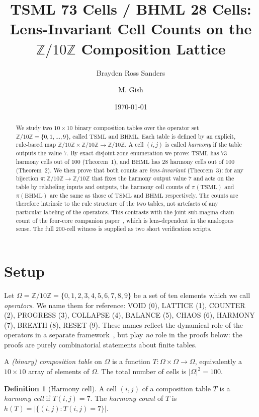 \documentclass[11pt,reqno]{amsart}
\title[TSML 73 / BHML 28 cells on $\Zten$]
  {TSML 73 Cells / BHML 28 Cells:\\
   Lens-Invariant Cell Counts on the\\
   $\mathbb{Z}/10\mathbb{Z}$ Composition Lattice}
\author{Brayden Ross Sanders}
\author{M. Gish}
\date{\today}
\theoremstyle{plain}
\theoremstyle{definition}
\newtheorem{definition}[theorem]{Definition}
\theoremstyle{remark}
\newcommand{\Z}{\mathbb{Z}}
\newcommand{\Zten}{\Z/10\Z}
\newcommand{\TSML}{\mathrm{TSML}}
\newcommand{\BHML}{\mathrm{BHML}}
\begin{document}
\begin{abstract}
We study two $10\times10$ binary composition tables over the
operator set $\Zten = \{0,1,\ldots,9\}$, called $\TSML$ and
$\BHML$. Each table is defined by an explicit, rule-based map
$\Zten \times \Zten \to \Zten$. A cell $(i,j)$ is called
\emph{harmony} if the table outputs the value $7$. By exact
disjoint-zone enumeration we prove:
$\TSML$ has $73$ harmony cells out of $100$ (Theorem~1), and
$\BHML$ has $28$ harmony cells out of $100$ (Theorem~2). We then
prove that both counts are \emph{lens-invariant} (Theorem~3): for
any bijection $\pi : \Zten \to \Zten$ that fixes the harmony
output value $7$ and acts on the table by relabeling inputs and
outputs, the harmony cell counts of $\pi(\TSML)$ and $\pi(\BHML)$
are the same as those of $\TSML$ and $\BHML$ respectively. The
counts are therefore intrinsic to the rule structure of the two
tables, not artefacts of any particular labeling of the
operators. This contrasts with the joint sub-magma chain count of
the four-core companion paper~\cite{J02}, which is lens-dependent
in the analogous sense. The full $200$-cell witness is supplied as
two short verification scripts.
\end{abstract}

\maketitle

\section{Setup}\label{sec:setup}

Let $\Omega = \Zten = \{0, 1, 2, 3, 4, 5, 6, 7, 8, 9\}$ be a set of
ten elements which we call \emph{operators}. We name them for
reference: VOID (0), LATTICE (1), COUNTER (2), PROGRESS (3),
COLLAPSE (4), BALANCE (5), CHAOS (6), HARMONY (7), BREATH (8),
RESET (9). These names reflect the dynamical role of the operators
in a separate framework~\cite{Sanders2026}, but play \emph{no} role
in the proofs below: the proofs are purely combinatorial statements
about finite tables.

A \emph{(binary) composition table} on $\Omega$ is a function
$T : \Omega \times \Omega \to \Omega$, equivalently a $10 \times 10$
array of elements of $\Omega$. The total number of cells is
$|\Omega|^2 = 100$.

\begin{definition}[Harmony cell]\label{def:harm}
A cell $(i, j)$ of a composition table $T$ is a \emph{harmony cell}
if $T(i, j) = 7$. The \emph{harmony count} of $T$ is
$h(T) = |\{(i, j) : T(i, j) = 7\}|$.
\end{definition}
\end{document}
